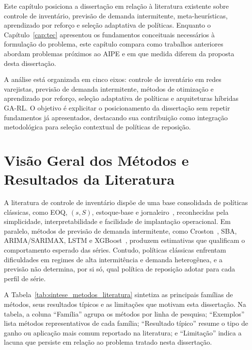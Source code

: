 ﻿

Este capítulo posiciona a dissertação em relação à literatura existente sobre controle de inventário, previsão de demanda intermitente, meta-heurísticas, aprendizado por reforço e seleção adaptativa de políticas. Enquanto o Capítulo~\ref{cap:tec} apresentou os fundamentos conceituais necessários à formulação do problema, este capítulo compara como trabalhos anteriores abordam problemas próximos ao AIPE e em que medida diferem da proposta desta dissertação.

A análise está organizada em cinco eixos: controle de inventário em redes varejistas, previsão de demanda intermitente, métodos de otimização e aprendizado por reforço, seleção adaptativa de políticas e arquiteturas híbridas GA-RL. O objetivo é explicitar o posicionamento da dissertação sem repetir fundamentos já apresentados, destacando sua contribuição como integração metodológica para seleção contextual de políticas de reposição.

\section{Visão Geral dos Métodos e Resultados da Literatura}
\label{sec:visao_geral_literatura}

A literatura de controle de inventário dispõe de uma base consolidada de políticas clássicas, como EOQ, $(s,S)$, estoque-base e jornaleiro~\citep{Axsater2006InventoryControl,Zipkin2000FoundationsInventory}, reconhecidas pela simplicidade, interpretabilidade e facilidade de implantação operacional. Em paralelo, métodos de previsão de demanda intermitente, como Croston~\citep{Croston1972ForecastingIntermittentDemand}, SBA, ARIMA/SARIMAX, LSTM e XGBoost~\citep{Makridakis2020M4Competition,Nasseri2023RetailDemandPrediction}, produzem estimativas que qualificam o comportamento esperado das séries. Contudo, políticas clássicas enfrentam dificuldades em regimes de alta intermitência e demanda heterogênea, e a previsão não determina, por si só, qual política de reposição adotar para cada perfil de série.

A Tabela~\ref{tab:sintese_metodos_literatura} sintetiza as principais famílias de métodos, seus resultados típicos e as limitações que motivam esta dissertação. Na tabela, a coluna ``Família'' agrupa os métodos por linha de pesquisa; ``Exemplos'' lista métodos representativos de cada família; ``Resultado típico'' resume o tipo de ganho ou aplicação mais comum reportado na literatura; e ``Limitação'' indica a lacuna que persiste em relação ao problema tratado nesta dissertação.

